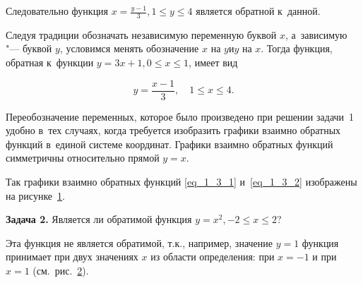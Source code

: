 Следовательно функция $\displaystyle x = \frac{y-1}{3}, 1 \leqslant y \leqslant 4$
является обратной к~данной.

Следуя традиции обозначать независимую переменную буквой $x$,
а~зависимую "--- буквой $y$, условимся менять обозначение $x$ на $y \text{и} y$ на $x$.
Тогда функция, обратная к~функции $y = 3x + 1, 0 \leqslant x \leqslant 1$,
имеет вид

\begin{equation}\label{eq_1_3_2}
\displaystyle y = \frac{x-1}{3}, \quad 1 \leqslant x \leqslant 4.
\end{equation}

Переобозначение переменных, которое было произведено при решении задачи~1
удобно в~тех случаях, когда требуется изобразить графики взаимно обратных функций
в~единой системе координат. Графики взаимно обратных функций симметричны
относительно прямой $y = x$.

Так графики взаимно обратных функций \eqref{eq_1_3_1} и~\eqref{eq_1_3_2}
изображены на рисунке~\ref{fig_1_3_3}.

\begin{figure}\label{fig_1_3_3}
\end{figure}

\textbf{Задача 2.} Является ли обратимой функция
$y = x^{2}, -2 \leqslant x \leqslant 2$?

Эта функция не является обратимой, т.к., например, значение $y = 1$
функция принимает при двух значениях $x$ из области определения:
при $x = -1$ и при $x = 1$ (см.\ рис.\ \ref{fig_1_3_4}).

\begin{figure}\label{fig_1_3_4}
\end{figure}

